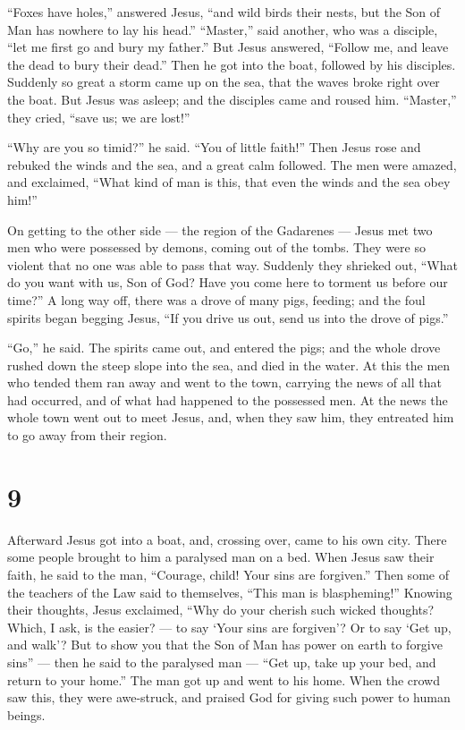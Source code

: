  ``Foxes have holes,'' answered Jesus, ``and wild birds
their nests, but the Son of Man has nowhere to lay his head.''
 ``Master,'' said another, who was a disciple, ``let me
first go and bury my father.''  But Jesus answered,
``Follow me, and leave the dead to bury their dead.''  Then
he got into the boat, followed by his disciples.  Suddenly
so great a storm came up on the sea, that the waves broke right over the
boat. But Jesus was asleep;  and the disciples came and
roused him. ``Master,'' they cried, ``save us; we are lost!''

 ``Why are you so timid?'' he said. ``You of little
faith!'' Then Jesus rose and rebuked the winds and the sea, and a great
calm followed.  The men were amazed, and exclaimed, ``What
kind of man is this, that even the winds and the sea obey him!''

 On getting to the other side --- the region of the
Gadarenes --- Jesus met two men who were possessed by demons, coming out
of the tombs. They were so violent that no one was able to pass that
way.  Suddenly they shrieked out, ``What do you want with
us, Son of God? Have you come here to torment us before our time?''
 A long way off, there was a drove of many pigs, feeding;
 and the foul spirits began begging Jesus, ``If you drive
us out, send us into the drove of pigs.''

 ``Go,'' he said. The spirits came out, and entered the
pigs; and the whole drove rushed down the steep slope into the sea, and
died in the water.  At this the men who tended them ran
away and went to the town, carrying the news of all that had occurred,
and of what had happened to the possessed men.  At the news
the whole town went out to meet Jesus, and, when they saw him, they
entreated him to go away from their region.

\hypertarget{section-8}{%
\section{9}\label{section-8}}

 Afterward Jesus got into a boat, and, crossing over, came
to his own city.  There some people brought to him a
paralysed man on a bed. When Jesus saw their faith, he said to the man,
``Courage, child! Your sins are forgiven.''  Then some of
the teachers of the Law said to themselves, ``This man is blaspheming!''
 Knowing their thoughts, Jesus exclaimed, ``Why do your
cherish such wicked thoughts?  Which, I ask, is the easier?
--- to say `Your sins are forgiven'? Or to say `Get up, and walk'?
 But to show you that the Son of Man has power on earth to
forgive sins'' --- then he said to the paralysed man --- ``Get up, take
up your bed, and return to your home.''  The man got up and
went to his home.  When the crowd saw this, they were
awe-struck, and praised God for giving such power to human beings.

